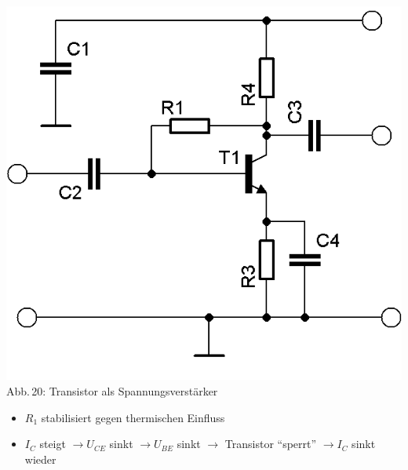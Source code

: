 \begin{frame}
  \begin{minipage}{0.4\textwidth}
	\begin{center}
		\includegraphics[width=\textwidth,height=.85\textheight,keepaspectratio]{a06/Transistor-Verstaerker-APstab2a.png}\\
		{\tiny Abb.\,20: Transistor als Spannungsverstärker~\cite{bnetza}}
	\end{center}
      \end{minipage}
      \hspace{3mm}
      \begin{minipage}{0.5\textwidth}
	\begin{itemize}
		\item $R_1$ stabilisiert gegen thermischen Einfluss
		\item $I_C$ steigt $\rightarrow U_{CE}$ sinkt $\rightarrow U_{BE}$ sinkt
              $\rightarrow$ Transistor ``sperrt'' $\rightarrow I_C$ sinkt wieder
	\end{itemize}
      \end{minipage}
\end{frame}

